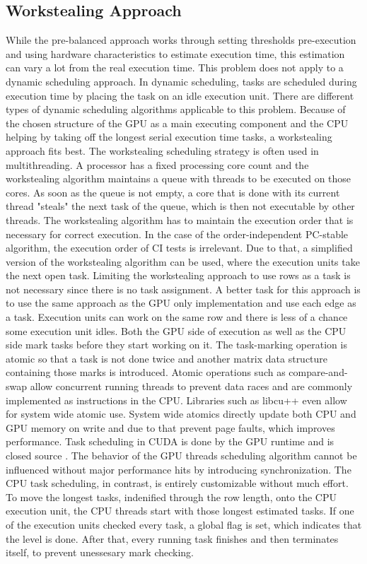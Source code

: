 \subsection{Workstealing Approach}
While the pre-balanced approach works through setting thresholds pre-execution and using hardware characteristics to estimate execution time, this estimation can vary a lot from the real execution time. This problem does not apply to a dynamic scheduling approach. In dynamic scheduling, tasks are scheduled during execution time by placing the task on an idle execution unit. There are different types of dynamic scheduling algorithms applicable to this problem.
Because of the chosen structure of the GPU as a main executing component and the CPU helping by taking off the longest serial execution time tasks, a workstealing approach fits best. The workstealing scheduling strategy is often used in multithreading. A processor has a fixed processing core count and the workstealing algorithm maintains a queue with threads to be executed on those cores. As soon as the queue is not empty, a core that is done with its current thread "steals" the next task of the queue, which is then not executable by other threads. The workstealing algorithm has to maintain the execution order that is necessary for correct execution. \cite{blumofeSchedulingMultithreadedComputations1999}
In the case of the order-independent PC-stable algorithm, the execution order of CI tests is irrelevant. Due to that, a simplified version of the workstealing algorithm can be used, where the execution units take the next open task.
Limiting the workstealing approach to use rows as a task is not necessary since there is no task assignment. A better task for this approach is to use the same approach as the GPU only implementation and use each edge as a task. Execution units can work on the same row and there is less of a chance some execution unit idles.
Both the GPU side of execution as well as the CPU side mark tasks before they start working on it. The task-marking operation is atomic so that a task is not done twice and another matrix data structure containing those marks is introduced. Atomic operations such as compare-and-swap allow concurrent running threads to prevent data races and are commonly implemented as instructions in the CPU.
Libraries such as libcu++ \cite{NVIDIALibcudacxx2021} even allow for system wide atomic use. System wide atomics directly update both CPU and GPU memory on write and due to that prevent page faults, which improves performance.
Task scheduling in CUDA is done by the GPU runtime and is closed source \cite{olmedoDissectingCUDAScheduling2020}. The behavior of the GPU threads scheduling algorithm cannot be influenced without major performance hits by introducing synchronization. The CPU task scheduling, in contrast, is entirely customizable without much effort. To move the longest tasks, indenified through the row length, onto the CPU execution unit, the CPU threads start with those longest estimated tasks.
If one of the execution units checked every task, a global flag is set, which indicates that the level is done. After that, every running task finishes and then terminates itself, to prevent unessesary mark checking.

